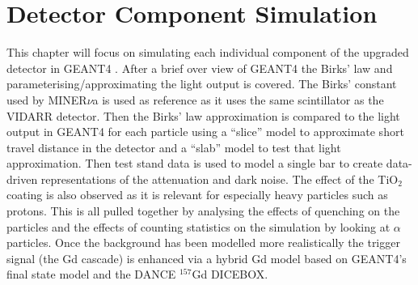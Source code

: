 

\chapter{Detector Component Simulation}\label{chp:GEANT4Simulation}
\ifpdf
    \graphicspath{{Chapter4/Figs/Raster/}{Chapter4/Figs/PDF/}{Chapter4/Figs/}}
\else
    \graphicspath{{Chapter4/Figs/Vector/}{Chapter4/Figs/}}
\fi

This chapter will focus on simulating each individual component of the upgraded detector in GEANT4 \cite{Agostinelli:2002hh}. After a brief over view of GEANT4 the Birks' law and parameterising/approximating the light output is covered. The Birks' constant used by MINER$\nu$a is used as reference as it uses the same scintillator as the VIDARR detector. Then the Birks' law approximation is compared to the light output in GEANT4 for each particle using a ``slice'' model to approximate short travel distance in the detector and a ``slab'' model to test that light approximation. Then test stand data is used to model a single bar to create data-driven representations of the attenuation and dark noise. The effect of the TiO$_2$ coating is also observed as it is relevant for especially heavy particles such as protons. This is all pulled together by analysing the effects of quenching on the particles and the effects of counting statistics on the simulation by looking at $\alpha$ particles. Once the background has been modelled more realistically the trigger signal (the Gd cascade) is enhanced via a hybrid Gd model based on GEANT4's final state model and the DANCE $^{157}$Gd DICEBOX. 

